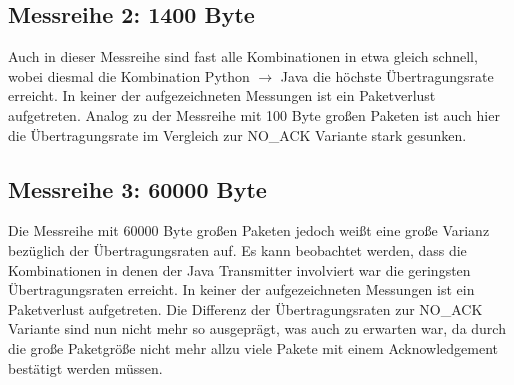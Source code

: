 \documentclass{article}
\begin{document}
    \subsection{Messreihe 2: 1400 Byte}
    Auch in dieser Messreihe sind fast alle Kombinationen in etwa gleich schnell, wobei diesmal die Kombination
    Python $\rightarrow$ Java die höchste Übertragungsrate erreicht.
    In keiner der aufgezeichneten Messungen ist ein Paketverlust aufgetreten.
    Analog zu der Messreihe mit 100 Byte großen Paketen ist auch hier die Übertragungsrate im Vergleich zur
    NO\_ACK Variante stark gesunken.

    \subsection{Messreihe 3: 60000 Byte}
    Die Messreihe mit 60000 Byte großen Paketen jedoch weißt eine große Varianz bezüglich der Übertragungsraten auf.
    Es kann beobachtet werden, dass die Kombinationen in denen der Java Transmitter involviert war die geringsten
    Übertragungsraten erreicht.
    In keiner der aufgezeichneten Messungen ist ein Paketverlust aufgetreten.
    Die Differenz der Übertragungsraten zur NO\_ACK Variante sind nun nicht mehr so ausgeprägt, was auch zu erwarten war,
    da durch die große Paketgröße nicht mehr allzu viele Pakete mit einem Acknowledgement bestätigt werden müssen.
\end{document}
